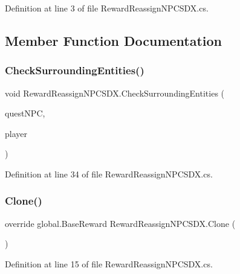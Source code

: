 Definition at line 3 of file Reward\+Reassign\+N\+P\+C\+S\+D\+X.\+cs.



\subsection{Member Function Documentation}
\mbox{\label{class_reward_reassign_n_p_c_s_d_x_a3b469f6ce06b7a05b7a680fabb8fe5ad}} 
\subsubsection{\texorpdfstring{CheckSurroundingEntities()}{CheckSurroundingEntities()}}
{\footnotesize\ttfamily void Reward\+Reassign\+N\+P\+C\+S\+D\+X.\+Check\+Surrounding\+Entities (\begin{DoxyParamCaption}\item[{\mbox{\hyperlink{class_entity_alive_s_d_x}{Entity\+Alive\+S\+DX}}}]{quest\+N\+PC,  }\item[{Entity\+Player}]{player }\end{DoxyParamCaption})}



Definition at line 34 of file Reward\+Reassign\+N\+P\+C\+S\+D\+X.\+cs.

\mbox{\label{class_reward_reassign_n_p_c_s_d_x_ab066d21f87e829a62a67da0d347b346c}} 
\subsubsection{\texorpdfstring{Clone()}{Clone()}}
{\footnotesize\ttfamily override global.\+Base\+Reward Reward\+Reassign\+N\+P\+C\+S\+D\+X.\+Clone (\begin{DoxyParamCaption}{ }\end{DoxyParamCaption})}



Definition at line 15 of file Reward\+Reassign\+N\+P\+C\+S\+D\+X.\+cs.

\mbox{\label{class_reward_reassign_n_p_c_s_d_x_a8433652ccfadd1af0de4179945a86092}} 
